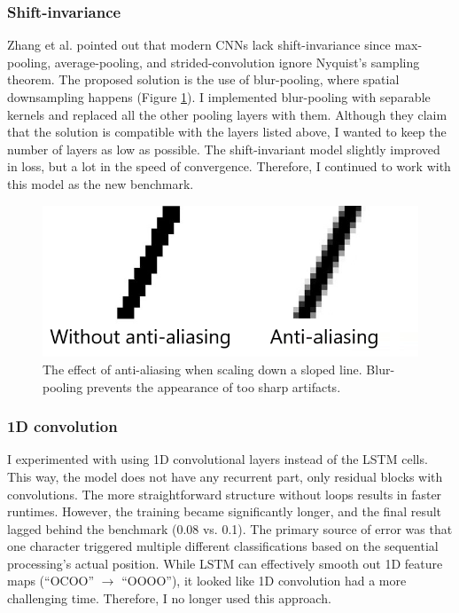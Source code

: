 \subsubsection{Shift-invariance}

Zhang et al.\cite{Shift-Invariant} pointed out that modern CNNs lack shift-invariance since max-pooling, average-pooling, and strided-convolution ignore Nyquist's sampling theorem. The proposed solution is the use of blur-pooling, where spatial downsampling happens (Figure \ref{fig:anti_aliasing}). I implemented blur-pooling with separable kernels and replaced all the other pooling layers with them. Although they claim that the solution is compatible with the layers listed above, I wanted to keep the number of layers as low as possible. The shift-invariant model slightly improved in loss, but a lot in the speed of convergence. Therefore, I continued to work with this model as the new benchmark.

\begin{figure}[htb]
 \centerline{\includegraphics[width=0.6\columnwidth]{.//Figure/OCR/anti_aliasing.png}}
 \caption{The effect of anti-aliasing when scaling down a sloped line. Blur-pooling prevents the appearance of too sharp artifacts.}
 \label{fig:anti_aliasing}
\end{figure}

\subsubsection{1D convolution}

I experimented with using 1D convolutional layers instead of the LSTM cells. This way, the model does not have any recurrent part, only residual blocks with convolutions. The more straightforward structure without loops results in faster runtimes. However, the training became significantly longer, and the final result lagged behind the benchmark (0.08 vs. 0.1). The primary source of error was that one character triggered multiple different classifications based on the sequential processing's actual position. While LSTM can effectively smooth out 1D feature maps (``OCOO'' $\rightarrow$ ``OOOO''), it looked like 1D convolution had a more challenging time. Therefore, I no longer used this approach.

